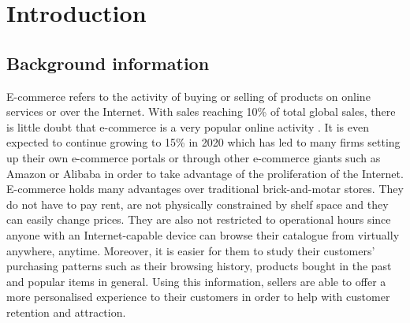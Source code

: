 \documentclass[a4paper]{article}
\begin{document}
\pagebreak
\large
\tableofcontents



\pagebreak
\section{Introduction}
\subsection{Background information}
E-commerce refers to the activity of buying or selling of products on online services or over the Internet. With sales reaching 10\% of total global sales, there is little doubt that e-commerce is a very popular online activity \cite{nano3}. It is even expected to continue growing to 15\% in 2020 which has led to many firms setting up their own e-commerce portals or through other e-commerce giants such as Amazon or Alibaba in order to take advantage of the proliferation of the Internet. E-commerce holds many advantages over traditional brick-and-motar stores. They do not have to pay rent, are not physically constrained by shelf space and they can easily change prices. They are also not restricted to operational hours since anyone with an Internet-capable device can browse their catalogue from virtually anywhere, anytime. Moreover, it is easier for them to study their customers' purchasing patterns such as their browsing history, products bought in the past and popular items in general. Using this information, sellers are able to offer a more personalised experience to their customers in order to help with customer retention and attraction.
\newline
\newline
\end{document}

